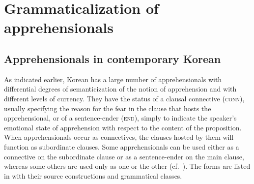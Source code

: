 \documentclass[output=paper,colorlinks,citecolor=brown]{langscibook}
\begin{document}
\section{Grammaticalization of apprehensionals}
\label{sec:rhee:grammaticalization}

\subsection{Apprehensionals in contemporary Korean}
\label{subsec:appinKorean}

As indicated earlier, Korean has a large number of apprehensionals with differential degrees of semanticization of the notion of apprehension and with different levels of currency. They have the status of a clausal connective (\textsc{conn}), usually specifying the reason for the fear in the clause that hosts the apprehensional, or of a sentence-ender (\textsc{end}), simply to indicate the speaker's emotional state of apprehension with respect to the content of the proposition. When apprehensionals occur as connectives, the clauses hosted by them will function as subordinate clauses. Some apprehensionals can be used either as a connective on the subordinate clause or as a sentence-ender on the main clause, whereas some others are used only as one or the other (cf.\ \citealt{Ramstedt1997,Kim1960,Ko1989,Son1994}). The forms are listed in  with their source constructions and grammatical classes. 
\end{document}
